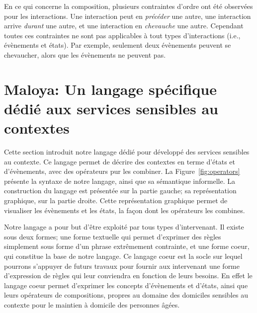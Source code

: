 En ce qui concerne la composition, plusieurs contraintes d'ordre ont été observées pour les interactions. Une interaction peut en {\em précéder} une autre, une interaction arrive {\em durant} une autre, et une interaction en {\em chevauche} une autre. Cependant toutes ces contraintes ne sont pas applicables à tout types d'interactions ({i.e.,} évènements et états). Par exemple, seulement deux évènements peuvent se chevaucher, alors que les évènements ne peuvent pas. 

\section{Maloya: Un langage spécifique dédié aux services sensibles au contextes}\label{sec:dsl}

Cette section introduit notre langage dédié pour développé des services sensibles au contexte. Ce langage permet de décrire des contextes en terme d'états et d'évènements, avec des opérateurs pur les combiner. La Figure~\ref{fig:operators} présente la syntaxe de notre langage, ainsi que sa sémantique informelle. La construction du langage est présentée sur la partie gauche; sa représentation graphique, sur la partie droite. Cette représentation graphique permet de visualiser les évènements et les états, la façon dont les opérateurs les combines. 
 

Notre langage a pour but d'être exploité par tous types d'intervenant. Il existe sous deux formes; une forme textuelle qui permet d'exprimer des règles simplement sous forme d'un phrase extrêmement contrainte, et une forme coeur, qui constitue la base de notre langage. Ce langage coeur est la socle sur lequel pourrons s'appuyer de futurs travaux pour fournir aux intervenant une forme d'expression de règles qui leur conviendra en fonction de leurs besoins. En effet le langage coeur permet d'exprimer les concepts d'évènements et d'états, ainsi que leurs opérateurs de compositions, propres au domaine des domiciles sensibles au contexte pour le maintien à domicile des personnes âgées.

